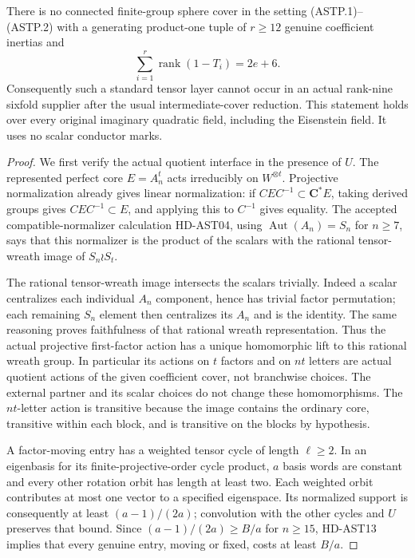 \begin{theorem}[HD-AST14]
There is no connected finite-group sphere cover in the setting
(ASTP.1)--(ASTP.2) with a generating product-one tuple of $r\ge12$
genuine coefficient inertias and
\[
                    \sum_{i=1}^r\operatorname{rank}(1-T_i)=2e+6.
 \tag{ASTP.8}
\]
Consequently such a standard tensor layer cannot occur in an actual
rank-nine sixfold supplier after the usual intermediate-cover
reduction.  This statement holds over every original imaginary
quadratic field, including the Eisenstein field.  It uses no scalar
conductor marks.
\end{theorem}

\begin{proof}
We first verify the actual quotient interface in the presence of $U$.
The represented perfect core $E=A_n^t$ acts irreducibly on
$W^{\otimes t}$.  Projective normalization already gives linear
normalization: if $C E C^{-1}\subset\mathbf C^*E$, taking derived
groups gives $C E C^{-1}\subset E$, and applying this to $C^{-1}$
gives equality.  The accepted compatible-normalizer calculation
HD-AST04, using $\operatorname{Aut}(A_n)=S_n$ for $n\ge7$, says
that this normalizer is the product of the scalars with the rational
tensor-wreath image of $S_n\wr S_t$.

The rational tensor-wreath image intersects the scalars trivially.
Indeed a scalar centralizes each individual $A_n$ component, hence
has trivial factor permutation; each remaining $S_n$ element then
centralizes its $A_n$ and is the identity.  The same reasoning
proves faithfulness of that rational wreath representation.  Thus
the actual projective first-factor action has a unique homomorphic
lift to this rational wreath group.  In particular its actions on
$t$ factors and on $nt$ letters are actual quotient actions of the
given coefficient cover, not branchwise choices.  The external
partner and its scalar choices do not change these homomorphisms.
The $nt$-letter action is transitive because the image contains the
ordinary core, transitive within each block, and is transitive on
the blocks by hypothesis.

A factor-moving entry has a weighted tensor cycle of length
$\ell\ge2$.  In an eigenbasis for its finite-projective-order
cycle product, $a$ basis words are constant and every other rotation
orbit has length at least two.  Each weighted orbit contributes
at most one vector to a specified eigenspace.  Its normalized
support is consequently at least $(a-1)/(2a)$; convolution with
the other cycles and $U$ preserves that bound.  Since
$(a-1)/(2a)\ge B/a$ for $n\ge15$, HD-AST13 implies that every
genuine entry, moving or fixed, costs at least $B/a$.


\end{proof}
